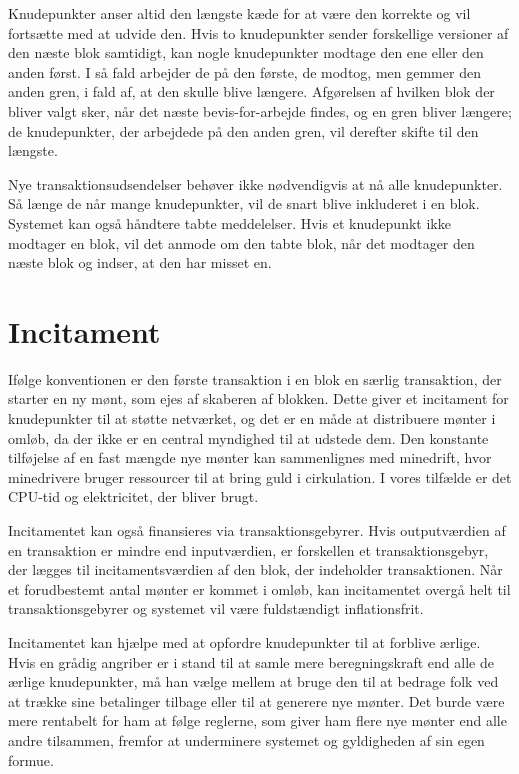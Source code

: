 \documentclass{article}
\begin{document}
Knudepunkter anser altid den længste kæde for at være den korrekte og vil fortsætte med at udvide den. Hvis to knudepunkter sender forskellige versioner af den næste blok
samtidigt, kan nogle knudepunkter modtage den ene eller den anden først. I så fald arbejder de på den første, de modtog, men gemmer den anden gren, i fald af, at den skulle
blive længere. Afgørelsen af hvilken blok der bliver valgt sker, når det næste bevis-for-arbejde findes, og en gren bliver længere; de knudepunkter, der arbejdede på den anden
gren, vil derefter skifte til den længste.

Nye transaktionsudsendelser behøver ikke nødvendigvis at nå alle knudepunkter. Så længe de når mange knudepunkter, vil de snart blive inkluderet i en blok. Systemet kan også
håndtere tabte meddelelser. Hvis et knudepunkt ikke modtager en blok, vil det anmode om den tabte blok, når det modtager den næste blok og indser, at den har misset en.

\section{Incitament}\label{sec:incentive}
Ifølge konventionen er den første transaktion i en blok en særlig transaktion, der starter en ny mønt, som ejes af skaberen af blokken.
Dette giver et incitament for knudepunkter til at støtte netværket, og det er en måde at distribuere mønter i omløb, da der ikke er en central myndighed til at udstede dem.
Den konstante tilføjelse af en fast mængde nye mønter kan sammenlignes med minedrift, hvor minedrivere bruger ressourcer til at bring guld i cirkulation. I vores tilfælde er
det CPU-tid og elektricitet, der bliver brugt.

Incitamentet kan også finansieres via transaktionsgebyrer. Hvis outputværdien af en transaktion er mindre end inputværdien, er forskellen et transaktionsgebyr, der lægges til
incitamentsværdien af den blok, der indeholder transaktionen. Når et forudbestemt antal mønter er kommet i omløb, kan incitamentet overgå helt til transaktionsgebyrer og systemet
vil være fuldstændigt inflationsfrit.

Incitamentet kan hjælpe med at opfordre knudepunkter til at forblive ærlige. Hvis en grådig angriber er i stand til at samle mere beregningskraft end alle de ærlige knudepunkter,
må han vælge mellem at bruge den til at bedrage folk ved at trække sine betalinger tilbage eller til at generere nye mønter. Det burde være mere rentabelt for ham at følge
reglerne, som giver ham flere nye mønter end alle andre tilsammen, fremfor at underminere systemet og gyldigheden af sin egen formue.
\end{document}
